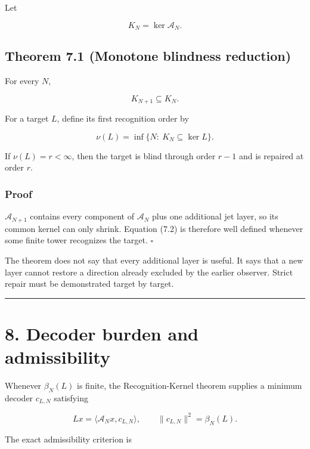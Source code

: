 Let

\[
K_N=\ker\mathcal A_N.
\]

\hypertarget{theorem-7.1-monotone-blindness-reduction}{%
\subsection{Theorem 7.1 (Monotone blindness reduction)}\label{theorem-7.1-monotone-blindness-reduction}}

For every \(N\),

\[
\boxed{K_{N+1}\subseteq K_N.}
\tag{7.1}
\]

For a target \(L\), define its first recognition order by

\[
\boxed{
\nu(L)
=
\inf\{N:\ K_N\subseteq\ker L\}.
}
\tag{7.2}
\]

If \(\nu(L)=r<\infty\), then the target is blind through order \(r-1\) and is
repaired at order \(r\).

\hypertarget{proof-4}{%
\subsubsection{Proof}\label{proof-4}}

\(\mathcal A_{N+1}\) contains every component of \(\mathcal A_N\) plus one
additional jet layer, so its common kernel can only shrink. Equation (7.2) is
therefore well defined whenever some finite tower recognizes the target.
\(\square\)

The theorem does not say that every additional layer is useful. It says that a
new layer cannot restore a direction already excluded by the earlier observer.
Strict repair must be demonstrated target by target.

\begin{center}\rule{0.5\linewidth}{0.5pt}\end{center}

\hypertarget{decoder-burden-and-admissibility}{%
\section{8. Decoder burden and admissibility}\label{decoder-burden-and-admissibility}}

Whenever \(\beta_N(L)\) is finite, the Recognition-Kernel theorem supplies a
minimum decoder \(c_{L,N}\) satisfying

\[
Lx=\langle\mathcal A_Nx,c_{L,N}\rangle,
\qquad
\|c_{L,N}\|^2=\beta_N(L).
\tag{8.1}
\]

The exact admissibility criterion is

